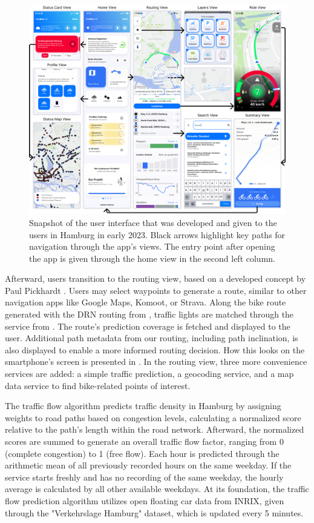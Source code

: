 \begin{figure}[t]
\caption{Snapshot of the user interface that was developed and given to the users in Hamburg in early 2023. Black arrows highlight key paths for navigation through the app's views. The entry point after opening the app is given through the home view in the second left column.}\label{fig:app}
\includegraphics[width=\linewidth]{images/app.png}
\end{figure}

Afterward, users transition to the routing view, based on a developed concept by Paul Pickhardt \cite{pickhardt_2022}. Users may select waypoints to generate a route, similar to other navigation apps like Google Maps, Komoot, or Strava. Along the bike route generated with the DRN routing from , traffic lights are matched through the service from . The route's prediction coverage is fetched and displayed to the user. Additional path metadata from our routing, including path inclination, is also displayed to enable a more informed routing decision. How this looks on the smartphone's screen is presented in . In the routing view, three more convenience services are added: a simple traffic prediction, a geocoding service, and a map data service to find bike-related points of interest.

The traffic flow algorithm predicts traffic density in Hamburg by assigning weights to road paths based on congestion levels, calculating a normalized score relative to the path's length within the road network. Afterward, the normalized scores are summed to generate an overall traffic flow factor, ranging from 0 (complete congestion) to 1 (free flow). Each hour is predicted through the arithmetic mean of all previously recorded hours on the same weekday. If the service starts freshly and has no recording of the same weekday, the hourly average is calculated by all other available weekdays. At its foundation, the traffic flow prediction algorithm utilizes open floating car data from INRIX, given through the "Verkehrslage Hamburg" dataset, which is updated every 5 minutes.

